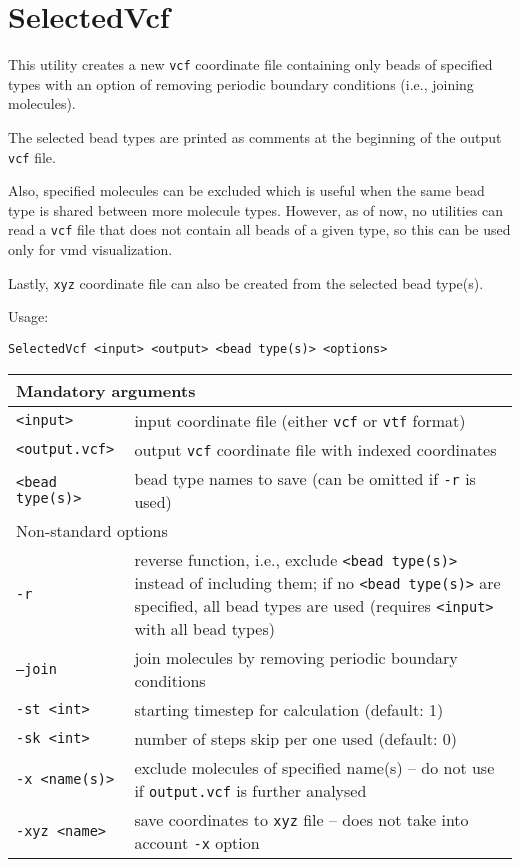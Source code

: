 \section{SelectedVcf} \label{sec:SelectedVcf}

This utility creates a new \texttt{vcf} coordinate file containing only
beads of specified types with an option of removing periodic boundary
conditions (i.e., joining molecules).

The selected bead types are printed as comments at the beginning of the
output \texttt{vcf} file.

Also, specified molecules can be excluded which is useful when the same
bead type is shared between more molecule types. However, as of now, no
utilities can read a \texttt{vcf} file that does not contain all beads of a
given type, so this can be used only for vmd visualization.

Lastly, \texttt{xyz} coordinate file can also be created from the selected
bead type(s).

Usage:

\vspace{1em}
\noindent
\texttt{SelectedVcf <input> <output> <bead type(s)> <options>}

\vspace{1em}
\noindent
\begin{longtable}{p{}p{}}
  \toprule
  \multicolumn{2}{l}{Mandatory arguments} \\
  \midrule
  \texttt{<input>} & input coordinate file (either \texttt{vcf} or
    \texttt{vtf} format) \\
  \texttt{<output.vcf>} & output \texttt{vcf} coordinate file with indexed
    coordinates \\
  \texttt{<bead type(s)>} & bead type names to save (can be omitted if
    \texttt{-r} is used) \\
  \toprule
  \multicolumn{2}{l}{Non-standard options} \\
  \midrule
  \texttt{-r} & reverse function, i.e., exclude \texttt{<bead type(s)>}
    instead of including them; if no \texttt{<bead type(s)>} are specified,
    all bead types are used (requires \texttt{<input>} with all bead types) \\
  \texttt{--join} & join molecules by removing periodic boundary conditions \\
  \texttt{-st <int>} & starting timestep for calculation (default: 1) \\
  \texttt{-sk <int>} & number of steps skip per one used (default: 0) \\
  \texttt{-x <name(s)>} & exclude molecules of specified name(s) -- do not
    use if \texttt{output.vcf} is further analysed \\
  \texttt{-xyz <name>} & save coordinates to \texttt{xyz} file -- does not
    take into account \texttt{-x} option \\
  \bottomrule
\end{longtable}

